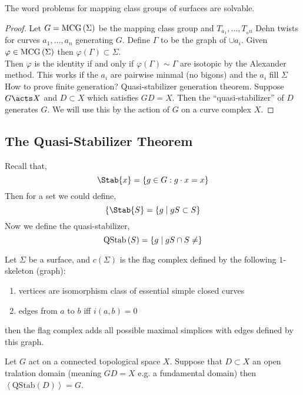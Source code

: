\documentclass[12pt]{extarticle}
\begin{document}
\begin{thm}
The word problems for mapping class groups of surfaces are solvable.
\end{thm}

\begin{proof}
Let $G = \mathrm{MCG}\left( \Sigma \right)$ be the mapping class group and $T_{a_1}, \dots, T_{_an}$ Dehn twists for curves $a_1, \dots, a_n$ generating $G$. Define $\Gamma$ to be the graph of $\cup a_i$. Given $\varphi \in \mathrm{MCG}\left( \Sigma \right)$ then $\varphi(\Gamma) \subset \Sigma$. 
\bigskip\\
Then $\varphi$ is the identity if and only if $\varphi(\Gamma) \sim \Gamma$ are isotopic by the Alexander method. This works if the $a_i$ are pairwise minmal (no bigons) and the $a_i$ fill $\Sigma$
\bigskip\\
How to prove finite generation? Quasi-stabilizer generation theorem. Suppose $G \acts X$ and $D \subset X$ which satisfies $G D = X$. Then the ``quasi-stabilizer'' of $D$ generates $G$. We will use this by the action of $G$ on a curve complex $X$.
\end{proof}

\subsection{The Quasi-Stabilizer Theorem}

\newcommand{\QStab}[1]{\mathrm{QStab}\left( #1 \right)}

\begin{rmk}
Recall that,
\[ \Stab{x} = \{ g \in G : g \cdot x = x \} \]
Then for a set we could define,
\[ \{ \Stab{S} = \{ g \mid g S \subset S \} \]
Now we define the quasi-stabilizer,
\[ \QStab{S} = \{ g \mid g S \cap S \neq \empty \} \]
\end{rmk}

\begin{defn}
Let $\Sigma$ be a surface, and $c(\Sigma)$ is the flag complex defined by the following $1$-skeleton (graph):
\begin{enumerate}
\item vertices are isomorphism class of essential simple closed curves
\item edges from $a$ to $b$ iff $i(a,b) = 0$
\end{enumerate}
then the flag complex adds all possible maximal simplices with edges defined by this graph. 
\end{defn}

\begin{thm}
Let $G$ act on a connected topological space $X$. Suppose that $D \subset X$ an open tralation domain (meaning $G D = X$ e.g. a fundamental domain) then $\left< \QStab{D} \right> = G$. 
\end{thm}
\end{document}
